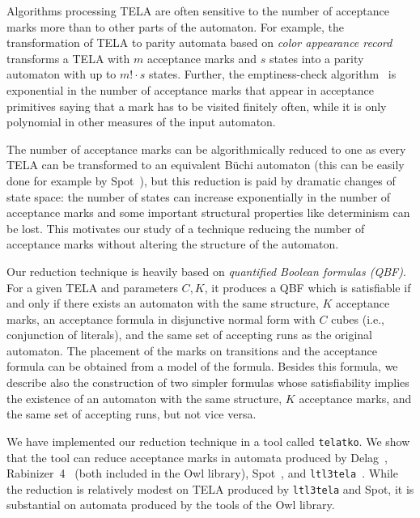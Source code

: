 \documentclass[a4paper,UKenglish,cleveref,autoref,thm-restate]{lipics-v2021}
\newcommand{\telatko}{\texttt{telatko}\xspace}
\begin{document}
Algorithms processing TELA are often sensitive to the number of
acceptance marks more than to other parts of the automaton. For
example, the transformation of TELA to parity automata based on
\emph{color appearance record}~\cite{renkin.20.atva} transforms a TELA
with $m$ acceptance marks and $s$ states into a parity automaton with
up to $m!\cdot s$ states. Further, the emptiness-check
algorithm~\cite{baier.19.atva} is exponential in the number of
acceptance marks that appear in acceptance primitives saying that a
mark has to be visited finitely often, while it is only polynomial in
other measures of the input automaton.

The number of acceptance marks can be algorithmically reduced to one
as every TELA can be transformed to an equivalent Büchi automaton
(this can be easily done for example by Spot~\cite{duret.16.atva2}),
but this reduction is paid by dramatic changes of state space: the
number of states can increase exponentially in the number of
acceptance marks and some important structural properties like
determinism can be lost. This motivates our study of a technique
reducing the number of acceptance marks without altering the structure
of the automaton.

Our reduction technique is heavily based on \emph{quantified Boolean
  formulas (QBF)}. For a given TELA and parameters $C,K$, it produces
a QBF which is satisfiable if and only if there exists an
automaton with the same structure, $K$ acceptance marks, an acceptance
formula in disjunctive normal form with $C$ cubes (i.e., conjunction
of literals), and the same set of accepting runs as the original
automaton. The placement of the marks on transitions and the
acceptance formula can be obtained from a model of the
formula. Besides this formula, we describe also the construction of
two simpler formulas whose satisfiability implies the existence of an
automaton with the same structure, $K$ acceptance marks, and the same
set of accepting runs, but not vice versa.

We have implemented our reduction technique in a tool called
\telatko. We show that the tool can reduce acceptance marks in
automata produced by Delag~\cite{muller.17.gandalf},
Rabinizer~4~\cite{kretinsky.18.cav} (both included in the Owl
library), Spot~\cite{duret.16.atva2}, and
\texttt{ltl3tela}~\cite{major.19.atva}.  While the reduction is
relatively modest on TELA produced by \texttt{ltl3tela} and Spot, it
is substantial on automata produced by the tools of the Owl library.
\end{document}
